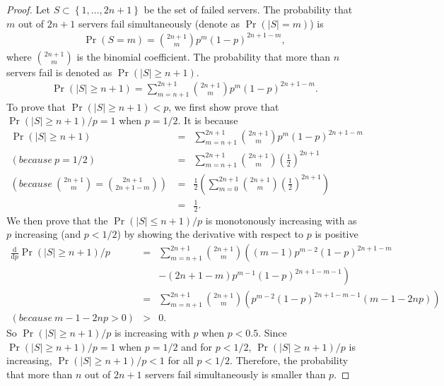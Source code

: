 \documentclass[11pt]{article}
\begin{document}
\begin{proof}
    Let $S \subset \left\{1,\ldots,2n+1\right\}$ be the set of failed servers.
    The probability that $m$ out of $2n+1$ servers fail simultaneously (denote as $\Pr(|S|=m)$) is 
    \begin{eqnarray*}
        \Pr(S=m) = \binom{2n+1}{m} p^{m} (1-p)^{2n+1-m},
    \end{eqnarray*}
    where $\binom{2n+1}{m}$ is the binomial coefficient.
    The probability that more than $n$ servers fail is denoted as $\Pr(|S|\geq n+1)$.
    \begin{eqnarray*}
        \Pr\left(|S|\geq n+1\right) = \sum_{m=n+1}^{2n+1} \binom{2n+1}{m} p^{m} (1-p)^{2n+1-m}.
    \end{eqnarray*}
    To prove that $\Pr(|S|\geq n+1) < p$, we first show prove that $\Pr(|S|\geq n+1)/p = 1$ 
    when $p=1/2$. It is because
    \begin{eqnarray*}
        \Pr(|S|\geq n+1) &=& \sum_{m=n+1}^{2n+1} \binom{2n+1}{m} p^{m} (1-p)^{2n+1-m} \\ 
        (because~p=1/2)~&=& \sum_{m=n+1}^{2n+1} \binom{2n+1}{m} \left(\frac{1}{2}\right)^{2n+1} \\
        \left(because~\binom{2n+1}{m}=\binom{2n+1}{2n+1-m}\right)~&=& \frac{1}{2}\left(  \sum_{m=0}^{2n+1} 
        \binom{2n+1}{m} \left(\frac{1}{2}\right)^{2n+1} \right) \\
        &=& \frac{1}{2}.
    \end{eqnarray*}
    We then prove that the $\Pr(|S|\leq n+1)/p$ is monotonously increasing with as $p$ 
    increasing (and $p<1/2$) by showing the derivative with respect to $p$ is positive
    \begin{eqnarray*}
        \frac{\mathrm{d}}{\mathrm{d}p}\Pr(|S|\geq n+1)/p &=& \sum_{m=n+1}^{2n+1} \binom{2n+1}{m} \left(\left(m-1\right)p^{m-2}
        \left(1-p\right)^{2n+1-m} \right.\\
        &&\left. - \left(2n+1-m\right)p^{m-1}\left(1-p\right)^{2n+1-m-1}\right) \\
        &=& \sum_{m=n+1}^{2n+1} \binom{2n+1}{m} \left(p^{m-2} 
        \left(1-p\right)^{2n+1-m-1}\left(m-1-2np\right)\right)\\
        (because~m-1-2np>0)&>& 0.
    \end{eqnarray*}
    So $\Pr(|S|\geq n+1)/p$ is increasing with $p$ when $p<0.5$.
    Since $\Pr(|S|\geq n+1)/p=1$ when $p=1/2$ and for $p<1/2$, $\Pr(|S|\geq n+1)/p$ is 
    increasing, $\Pr(|S|\geq n+1)/p < 1$ for all $p<1/2$. Therefore, the probability 
    that more than $n$ out of $2n+1$ servers fail simultaneously is smaller than 
    $p$.
\end{proof}

{}

\end{document}
